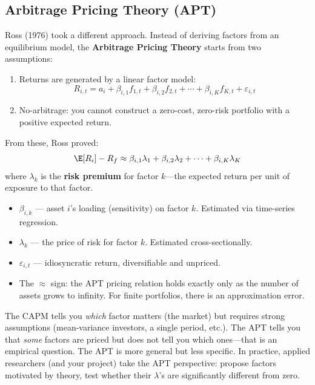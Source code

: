 \subsection{Arbitrage Pricing Theory (APT)}

Ross (1976) took a different approach. Instead of deriving factors from an equilibrium model, the \textbf{Arbitrage Pricing Theory} starts from two assumptions:

\begin{enumerate}[nosep]
  \item Returns are generated by a linear factor model:
  \begin{equation}
  R_{i,t} = a_i + \beta_{i,1} f_{1,t} + \beta_{i,2} f_{2,t} + \cdots + \beta_{i,K} f_{K,t} + \varepsilon_{i,t}
  \label{eq:apt-return}
  \end{equation}
  \item No-arbitrage: you cannot construct a zero-cost, zero-risk portfolio with a positive expected return.
\end{enumerate}

From these, Ross proved:
\begin{equation}
\E[R_i] - R_f \approx \beta_{i,1} \lambda_1 + \beta_{i,2} \lambda_2 + \cdots + \beta_{i,K} \lambda_K
\label{eq:apt-pricing}
\end{equation}
where $\lambda_k$ is the \textbf{risk premium} for factor $k$---the expected return per unit of exposure to that factor.

\begin{itemize}[nosep]
  \item $\beta_{i,k}$ --- asset $i$'s loading (sensitivity) on factor $k$. Estimated via time-series regression.
  \item $\lambda_k$ --- the price of risk for factor $k$. Estimated cross-sectionally.
  \item $\varepsilon_{i,t}$ --- idiosyncratic return, diversifiable and unpriced.
  \item The $\approx$ sign: the APT pricing relation holds exactly only as the number of assets grows to infinity. For finite portfolios, there is an approximation error.
\end{itemize}

\begin{keyidea}
The CAPM tells you \emph{which} factor matters (the market) but requires strong assumptions (mean-variance investors, a single period, etc.). The APT tells you that \emph{some} factors are priced but does not tell you which ones---that is an empirical question. The APT is more general but less specific. In practice, applied researchers (and your project) take the APT perspective: propose factors motivated by theory, test whether their $\lambda$'s are significantly different from zero.
\end{keyidea}

